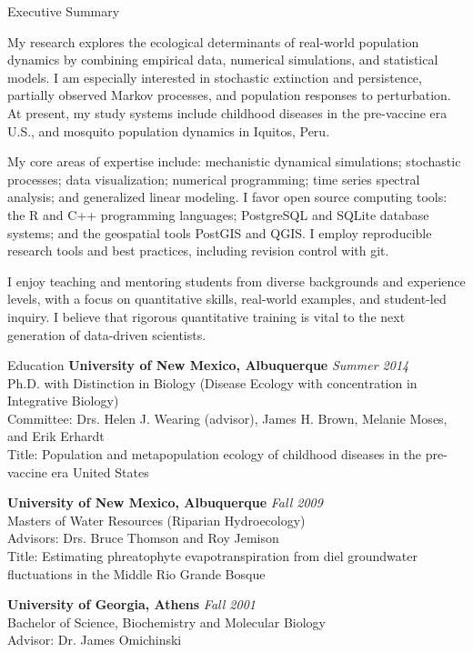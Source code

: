 \documentclass{resume} %
\begin{document}


\begin{rSection}{Executive Summary}
\item 
My research explores the ecological determinants of real-world population
dynamics by combining empirical data, numerical simulations, and statistical
models.  I am especially interested in stochastic extinction and persistence,
partially observed Markov processes, and population responses to perturbation.
At present, my study systems include childhood diseases in the pre-vaccine era
U.S., and mosquito population dynamics in Iquitos, Peru.

\item My core areas of expertise include: mechanistic dynamical simulations;
stochastic processes; data visualization; numerical programming; time series
spectral analysis; and generalized linear modeling.  I favor open source
computing tools: the R and C++ programming languages; PostgreSQL and SQLite
database systems; and the geospatial tools PostGIS and QGIS.  I employ
reproducible research tools and best practices, including revision control with
git.

\item  I enjoy teaching and mentoring students from diverse backgrounds and
experience levels, with a focus on quantitative skills, real-world examples, and
student-led inquiry.  I believe that rigorous quantitative training is vital
to the next generation of data-driven scientists.

\end{rSection}

\begin{rSection}{Education}
{\bf University of New Mexico, Albuquerque} \hfill {\em Summer 2014} \\ 
Ph.D. with Distinction in Biology (Disease Ecology with concentration in
Integrative Biology) \\
Committee: Drs. Helen J. Wearing (advisor), James H. Brown, Melanie Moses, and Erik Erhardt\\
Title: Population and metapopulation ecology of childhood diseases in the pre-vaccine era United States

{\bf University of New Mexico, Albuquerque} \hfill {\em Fall 2009} \\ 
Masters of Water Resources (Riparian Hydroecology) \\
Advisors: Drs. Bruce Thomson and Roy Jemison \\
Title: Estimating phreatophyte evapotranspiration from diel groundwater fluctuations in the Middle Rio Grande Bosque

{\bf University of Georgia, Athens} \hfill {\em Fall 2001} \\ 
Bachelor of Science, Biochemistry and Molecular Biology \\
Advisor: Dr. James Omichinski
\end{rSection}
\end{document}
